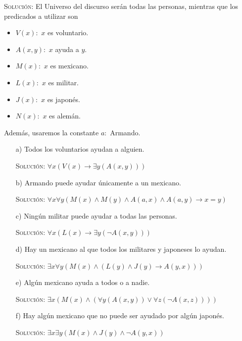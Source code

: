 \documentclass[letterpaper,11pt]{article}
\begin{document}
\begin{enumerate}
    \textsc{Solución:} El Universo del discurso serán todas las personas,
    mientras que los predicados a utilizar son 

    \begin{itemize}
        \item $V(x):$ $x$ es voluntario.
        \item $A(x, y):$ $x$ ayuda a $y$.
        \item $M(x):$ $x$ es mexicano.
        \item $L(x):$ $x$ es militar.
        \item $J(x):$ $x$ es japonés.
        \item $N(x):$ $x$ es alemán.
    \end{itemize}

    Además, usaremos la constante $a:$ Armando.

    \begin{itemize}
        \item[a)] Todos los voluntarios ayudan a alguien.

        \textsc{Solución:} $∀x (V(x) → ∃y (A(x, y)))$

        \item[b)] Armando puede ayudar únicamente a un mexicano.

        \textsc{Solución:} $∀x ∀y (M(x) \land M(y) \land A(a, x) \land A(a, y) → x = y)$

        \item[c)] Ningún militar puede ayudar a todas las personas.

        \textsc{Solución:} $∀x (L(x) → ∃y (\neg A(x, y)))$

        \item[d)] Hay un mexicano al que todos los militares y japoneses lo 
        ayudan.

        \textsc{Solución:} $∃x ∀y (M(x) \land (L(y) \land J(y) → A(y, x)))$
        
        \item[e)] Algún mexicano ayuda a todos o a nadie.

        \textsc{Solución:} $∃x (M(x) \land (∀y (A(x, y)) \lor ∀z (\neg A(x, z))))$

        \item[f)] Hay algún mexicano que no puede ser ayudado por algún 
        japonés. 

        \textsc{Solución:} $∃x ∃y (M(x) \land J(y) \land \neg A(y, x))$
        

\end{itemize}
\end{enumerate}
\end{document}
